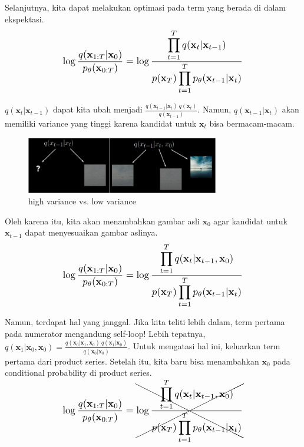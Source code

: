 \documentclass{article}
\newcommand*{\Scale}[2][4]{\scalebox{#1}{\ensuremath{#2}}}
\begin{document}
Selanjutnya, kita dapat melakukan optimasi pada term yang berada di dalam ekspektasi.
\begin{equation}
\Scale[1.2]{ \displaystyle \log \frac{q(\textbf{x}_{1:T}|\textbf{x}_0)}{p_\theta(\textbf{x}_{0:T})} = \log \frac{\displaystyle \prod_{t=1}^{T} q(\textbf{x}_{t}|\textbf{x}_{t-1})}{p(\textbf{x}_T) \displaystyle \prod_{t=1}^{T} p_\theta(\textbf{x}_{t-1}|\textbf{x}_{t})} }
\end{equation}

$ q(\textbf{x}_{t}|\textbf{x}_{t-1}) $ dapat kita ubah menjadi $ \frac{q(\textbf{x}_{t-1}|\textbf{x}_t) \ q(\textbf{x}_t) }{ q(\textbf{x}_{t-1}) } $. Namun, $ q(\textbf{x}_{t-1}|\textbf{x}_t) $ akan memiliki variance yang tinggi karena kandidat untuk $ \textbf{x}_{t} $ bisa bermacam-macam.
\begin{figure}[h]
    \centering
    \includegraphics[width=0.75\textwidth]{fig/high-variance-vs-low-variance.png}
    \caption{high variance vs. low variance}
    \label{fig:high-variance-vs-low-variance}
\end{figure}

Oleh karena itu, kita akan menambahkan gambar asli $ \textbf{x}_0 $ agar kandidat untuk $ \textbf{x}_{t-1} $ dapat menyesuaikan gambar aslinya.
\begin{equation}
\Scale[1.2]{ \displaystyle \log \frac{q(\textbf{x}_{1:T}|\textbf{x}_0)}{p_\theta(\textbf{x}_{0:T})} = \log \frac{\displaystyle \prod_{t=1}^{T} q(\textbf{x}_{t}|\textbf{x}_{t-1},\textbf{x}_0) } { p(\textbf{x}_T) \displaystyle \prod_{t=1}^{T} p_\theta(\textbf{x}_{t-1}|\textbf{x}_{t})} }
\end{equation}

Namun, terdapat hal yang janggal. Jika kita teliti lebih dalam, term pertama pada numerator mengandung self-loop! Lebih tepatnya, $ q(\textbf{x}_1|\textbf{x}_0,\textbf{x}_0) = \frac{q(\textbf{x}_0|\textbf{x}_1,\textbf{x}_0) \ q(\textbf{x}_1|\textbf{x}_0) }{ q(\textbf{x}_0|\textbf{x}_0) } $. Untuk mengatasi hal ini, keluarkan term pertama dari product series. Setelah itu, kita baru bisa menambahkan $ \textbf{x}_0 $ pada conditional probability di product series.
\begin{equation}
\Scale[1.2]{ \displaystyle \log \frac{q(\textbf{x}_{1:T}|\textbf{x}_0)}{p_\theta(\textbf{x}_{0:T})} =\xcancel{ \log \frac{\displaystyle \prod_{t=1}^{T} q(\textbf{x}_{t}|\textbf{x}_{t-1},\textbf{x}_0) } { p(\textbf{x}_T) \displaystyle \prod_{t=1}^{T} p_\theta(\textbf{x}_{t-1}|\textbf{x}_{t})} } }
\end{equation}
\end{document}
